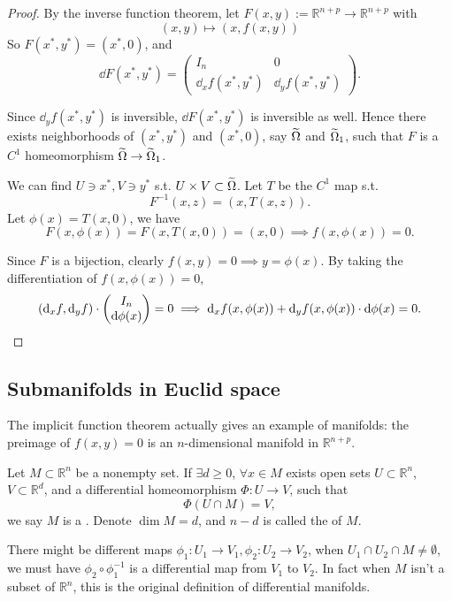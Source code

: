\begin{proof}[Proof]
    By the inverse function theorem,
	let $F(x,y):= \mathbb{R}^{n+p}\to \mathbb{R}^{n+p}$ with
	\[
		(x,y)\mapsto (x, f(x,y))
	\]
	So $F(x^*, y^*) = (x^*, 0)$, and
	\[
	\dd F(x^*, y^*) = \begin{pmatrix}
		I_n &0 \\ \dd_x f(x^*, y^*) &\dd_y f(x^*, y^*)
	\end{pmatrix}.
	\]

	Since $\dd_y f(x^*, y^*)$ is inversible, $\dd F(x^*, y^*)$ is
	inversible as well.
	Hence there exists neighborhoods of $(x^*, y^*)$ and $(x^*, 0)$,
	say $\widetilde{\Omega}$ and $\widetilde{\Omega}_1$, such that
	$F$ is a $C^1$ homeomorphism $\widetilde{\Omega}\to \widetilde{\Omega}_1$.

	We can find $U\ni x^*, V\ni y^*$ s.t. $U\times V \subset \widetilde{\Omega}$.
	Let $T$ be the $C^1$ map s.t.
	\[
	F^{-1}(x, z) = (x, T(x, z)).
	\]
	Let $\phi(x) = T(x, 0)$, we have
	\[
	F(x, \phi(x)) = F(x, T(x, 0)) = (x, 0) \implies f(x, \phi(x)) = 0.
	\]

	Since $F$ is a bijection, clearly $f(x, y) = 0\implies y=\phi(x)$.
	By taking the differentiation of $f(x, \phi(x)) = 0$,
	\[
		(\mathop{}\!\mathrm{d}_x f, \mathop{}\!\mathrm{d}_y f) \cdot \begin{pmatrix} I_n\\\mathop{}\!\mathrm{d} \phi(x) \end{pmatrix} = 0\implies
		\mathop{}\!\mathrm{d}_x f(x, \phi(x)) + \mathop{}\!\mathrm{d}_y f(x, \phi(x))\cdot \mathop{}\!\mathrm{d}\phi(x) = 0.
	\]
\end{proof}

\subsection{Submanifolds in Euclid space}
\label{sub:Submanifolds in Euclid space}
The implicit function theorem actually gives an example
of manifolds: the preimage of $f(x, y) = 0$ is an $n$-dimensional manifold
in $\mathbb{R}^{n+p}$.

\begin{definition}[Manifolds]
	Let $M \subset \mathbb{R}^{n}$ be a nonempty set.
	If $\exists d\ge 0$, $\forall x\in M$ exists open sets $U \subset \mathbb{R}^{n}$,
	$V \subset \mathbb{R}^{d}$, and a differential
	homeomorphism $\Phi: U\to V$, such that
	\[
		\Phi(U\cap M) = V,
	\]
	we say $M$ is a .
	Denote $\dim M = d$, and $n - d$ is called the  of $M$.
\end{definition}

\begin{remark}
    There might be different maps $\phi_1: U_1\to V_1, \phi_2: U_2\to V_2$,
	when $U_1\cap U_2 \cap M \ne \emptyset$, we must have $\phi_2\circ \phi_1^{-1}$
	is a differential map from $V_1$ to $V_2$. In fact when $M$ isn't a subset
	of $\mathbb{R}^{n}$, this is the original definition of differential manifolds.
\end{remark}

